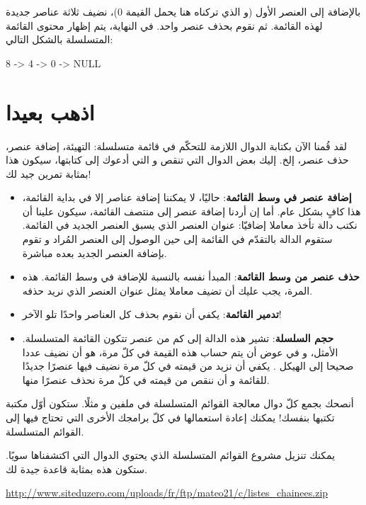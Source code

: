 بالإضافة إلى العنصر الأول (و الذي تركناه هنا يحمل القيمة 0)، نضيف ثلاثة عناصر جديدة لهذه القائمة. ثم نقوم بحذف عنصر واحد. في النهاية، يتم إظهار محتوى القائمة المتسلسلة بالشكل التالي:

\begin{Console}
8 -> 4 -> 0 -> NULL
\end{Console}


\section{اذهب بعيدا}

 لقد قُمنا الآن بكتابة الدوال اللازمة للتحكّم في قائمة متسلسلة: التهيئة، إضافة عنصر، حذف عنصر، إلخ. إليك بعض الدوال التي تنقص و التي أدعوك إلى كتابتها، سيكون هذا بمثابة تمرين جيد لك!

\begin{itemize}
	\item \textbf{إضافة عنصر في وسط القائمة}:
	حاليًا، لا يمكننا إضافة عناصر إلا في بداية القائمة، هذا كافٍ بشكل عام. أما إن أردنا إضافة عنصر إلى منتصف القائمة، سيكون علينا أن نكتب دالة تأخذ معاملا إضافيّا: عنوان العنصر الذي يسبق العنصر الجديد في القائمة. ستقوم الدالة بالتقدّم في القائمة إلى حين الوصول إلى العنصر المُراد و تقوم بإضافة العنصر الجديد بعده مباشرة.
	\item \textbf{حذف عنصر من وسط القائمة}:
	المبدأ نفسه بالنسبة للإضافة في وسط القائمة. هذه المرة، يجب عليك أن تضيف معاملا يمثل عنوان العنصر الذي نريد حذفه.
	\item \textbf{تدمير القائمة}:
	يكفي أن نقوم بحذف كل العناصر واحدًا تلو الآخر!
	\item \textbf{حجم السلسلة}:
	تشير هذه الدالة إلى كم من عنصر تتكون القائمة المتسلسلة. الأمثل، و في عوض أن يتم حساب هذه القيمة في كلّ مرة، هو أن نضيف عددا صحيحا
	إلى الهيكل
	.
	يكفي أن نزيد من قيمته في كلّ مرة نضيف فيها عنصرًا جديدًا للقائمة و أن ننقص من قيمته في كلّ مرة نحذف عنصرًا منها.
\end{itemize}

أنصحك بجمع كلّ دوال معالجة القوائم المتسلسلة في ملفين 
و
مثلًا. ستكون أوّل مكتبة تكتبها بنفسك! يمكنك إعادة استعمالها في كلّ برامجك الأخرى التي تحتاج فيها إلى القوائم المتسلسلة.

يمكنك تنزيل مشروع القوائم المتسلسلة الذي يحتوي الدوال التي اكتشفناها سويًا. ستكون هذه بمثابة قاعدة جيدة لك.

\url{http://www.siteduzero.com/uploads/fr/ftp/mateo21/c/listes_chainees.zip}

